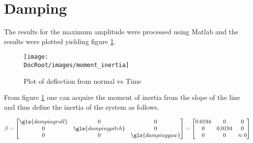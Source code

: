  \tocless\section{Damping}

 The results for the maximum amplitude were processed using Matlab and the results were plotted yielding figure \ref{fig: plot of angle vs time}.
\begin{figure}[t]
	\centering
	\texttt{[image: \\DocRoot/images/moment\_inertia]}
	\caption{Plot of deflection from normal  vs Time}
	\label{fig: plot of angle vs time}
\end{figure}

From figure \ref{fig: plot of angle vs time} one can acquire the moment of inertia from the slope of the line and thus define the inertia of the system as follows. 

\begin{align}
\beta =  
\begin{bmatrix}
\gls{dampingroll}  & 0 & 0 \\ 0& \gls{dampingpitch} & 0 \\0& 0& \gls{dampingyaw}
\end{bmatrix}
=
\begin{bmatrix}
 0.0194 & 0 & 0 \\ 0&  0.0194 & 0 \\0& 0&  \approx 0
\end{bmatrix}
\label{eq: damping of the system}
\end{align} 

